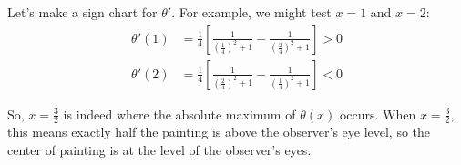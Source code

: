 \documentclass{article}
\begin{document}
\begin{enumerate}
{\begin{solution}
      Let's make a sign chart for $\theta'$.  For example, we might test $x
      = 1$ and $x = 2$:
      \begin{align*}
        \theta'(1) &= \frac{1}{4}
        \left[\frac{1}{\left(\frac{1}{4}\right)^2+1} -
          \frac{1}{\left(\frac{2}{4}\right)^2+1} \right]  > 0 \\
        \theta'(2) &= \frac{1}{4}
        \left[\frac{1}{\left(\frac{2}{4}\right)^2+1} -
          \frac{1}{\left(\frac{1}{4}\right)^2+1} \right] < 0
      \end{align*}
      \begin{center}
      \end{center}
      So, $x = \frac{3}{2}$ is indeed where the absolute maximum of
      $\theta(x)$ occurs. When $x = \frac{3}{2}$, this means exactly half
      the painting is above the observer's eye level, so the center of
      painting is at the level of the observer's eyes. 
    \end{solution}
  }    



  





\end{enumerate}
\end{document}
